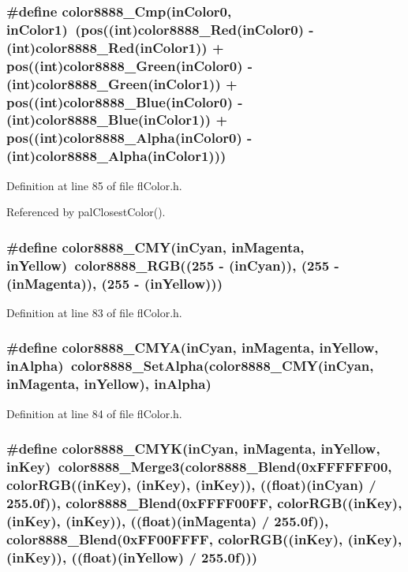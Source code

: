 \subsubsection{\setlength{\rightskip}{0pt plus 5cm}\#define color8888\_\-Cmp(in\-Color0, in\-Color1)~(pos((int)color8888\_\-Red(in\-Color0) - (int)color8888\_\-Red(in\-Color1)) + pos((int)color8888\_\-Green(in\-Color0) - (int)color8888\_\-Green(in\-Color1)) + pos((int)color8888\_\-Blue(in\-Color0) - (int)color8888\_\-Blue(in\-Color1)) + pos((int)color8888\_\-Alpha(in\-Color0) - (int)color8888\_\-Alpha(in\-Color1)))}\label{flColor_8h_c7fe25af6c89992e11a2d57994304fb3}




Definition at line 85 of file fl\-Color.h.

Referenced by pal\-Closest\-Color().
\subsubsection{\setlength{\rightskip}{0pt plus 5cm}\#define color8888\_\-CMY(in\-Cyan, in\-Magenta, in\-Yellow)~color8888\_\-RGB((255 - (in\-Cyan)), (255 - (in\-Magenta)), (255 - (in\-Yellow)))}\label{flColor_8h_72b7c3a7943951bf832c794ac93fb0c3}




Definition at line 83 of file fl\-Color.h.
\subsubsection{\setlength{\rightskip}{0pt plus 5cm}\#define color8888\_\-CMYA(in\-Cyan, in\-Magenta, in\-Yellow, in\-Alpha)~color8888\_\-Set\-Alpha(color8888\_\-CMY(in\-Cyan, in\-Magenta, in\-Yellow), in\-Alpha)}\label{flColor_8h_6bc1eaf94c1ce4da205597cf5a17d654}




Definition at line 84 of file fl\-Color.h.
\subsubsection{\setlength{\rightskip}{0pt plus 5cm}\#define color8888\_\-CMYK(in\-Cyan, in\-Magenta, in\-Yellow, in\-Key)~color8888\_\-Merge3(color8888\_\-Blend(0x\-FFFFFF00, color\-RGB((in\-Key), (in\-Key), (in\-Key)), ((float)(in\-Cyan) / 255.0f)), color8888\_\-Blend(0x\-FFFF00FF, color\-RGB((in\-Key), (in\-Key), (in\-Key)), ((float)(in\-Magenta) / 255.0f)), color8888\_\-Blend(0x\-FF00FFFF, color\-RGB((in\-Key), (in\-Key), (in\-Key)), ((float)(in\-Yellow) / 255.0f)))}\label{flColor_8h_5ca7cfa9d0dcbb050c4b157bbfb20ed1}




